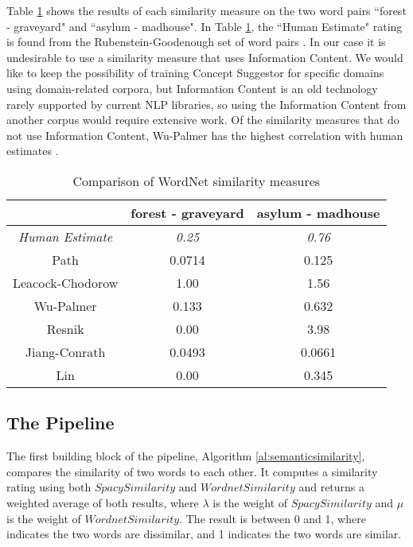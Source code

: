 \documentclass{article}
\begin{document}
Table \ref{table:wordnetsimilarity} shows the results of each similarity measure on the two word pairs ``forest - graveyard" and ``asylum - madhouse". In Table \ref{table:wordnetsimilarity}, the ``Human Estimate" rating is found from the Rubenstein-Goodenough set of word pairs \cite{rubenstein1965contextual}. In our case it is undesirable to use a similarity measure that uses Information Content. We would like to keep the possibility of training Concept Suggestor for specific domains using domain-related corpora, but Information Content is an old technology rarely supported by current NLP libraries, so using the Information Content from another corpus would require extensive work. Of the similarity measures that do not use Information Content, Wu-Palmer has the highest correlation with human estimates \citep{budanitsky2006evaluating,seco2004intrinsic,mihalcea2006corpus}. %

\begin{table}[h!]
\caption{Comparison of WordNet similarity measures} %
\centering
\begin{tabular}{|c||c|c|}
	\hline
	& forest - graveyard & asylum - madhouse \\
	\hline
	\textit{Human Estimate} & \textit{0.25} & \textit{0.76} \\
	Path & 0.0714 & 0.125 \\
	Leacock-Chodorow & 1.00 & 1.56 \\
	Wu-Palmer & 0.133 & 0.632 \\
	Resnik & 0.00 & 3.98 \\
	Jiang-Conrath & 0.0493 & 0.0661 \\
	Lin & 0.00 & 0.345 \\
	\hline
\end{tabular}
\label{table:wordnetsimilarity}
\end{table}

\subsection{The Pipeline}

The first building block of the pipeline, Algorithm \ref{al:semanticsimilarity}, compares the similarity of two words to each other. It computes a similarity rating using both $\textit{SpacySimilarity}$ and $\textit{WordnetSimilarity}$ and returns a weighted average of both results, where $\lambda$ is the weight of $\textit{SpacySimilarity}$ and $\mu$ is the weight of $\textit{WordnetSimilarity}$. The result is between 0 and 1, where indicates the two words are dissimilar, and 1 indicates the two words are similar.
\end{document}
